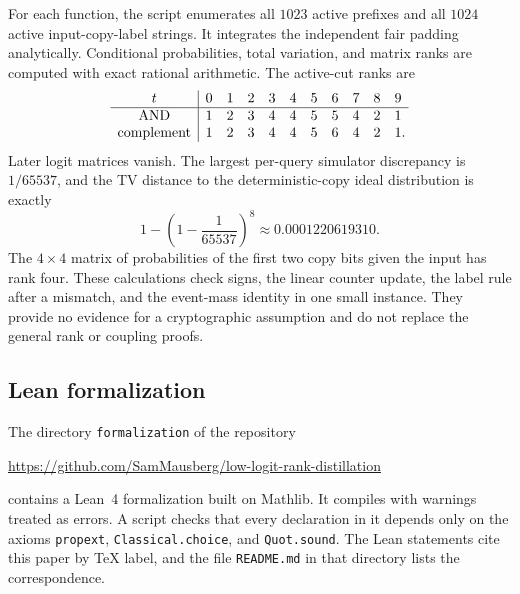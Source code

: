 \documentclass[11pt]{article}
\theoremstyle{definition}
\theoremstyle{remark}
\begin{document}
For each function, the script enumerates all $1023$ active prefixes and all $1024$ active input-copy-label strings. It integrates the independent fair padding analytically. Conditional probabilities, total variation, and matrix ranks are computed with exact rational arithmetic. The active-cut ranks are
\[
\begin{array}{c|rrrrrrrrrr}
t&0&1&2&3&4&5&6&7&8&9\\ \hline
\text{AND}&1&2&3&4&4&5&5&4&2&1\\
\text{complement}&1&2&3&4&4&5&6&4&2&1\mathrlap{.}
\end{array}
\]
Later logit matrices vanish. The largest per-query simulator discrepancy is $1/65537$, and the TV distance to the deterministic-copy ideal distribution is exactly
\[
1-\left(1-\frac1{65537}\right)^8
\approx0.0001220619310.
\]
The $4\times4$ matrix of probabilities of the first two copy bits given the input has rank four. These calculations check signs, the linear counter update, the label rule after a mismatch, and the event-mass identity in one small instance. They provide no evidence for a cryptographic assumption and do not replace the general rank or coupling proofs.

\subsection{Lean formalization}

The directory \texttt{formalization} of the repository
\begin{center}
\url{https://github.com/SamMausberg/low-logit-rank-distillation}
\end{center}
contains a Lean~4 formalization built on Mathlib. It compiles with warnings treated as errors. A script checks that every declaration in it depends only on the axioms \texttt{propext}, \texttt{Classical.choice}, and \texttt{Quot.sound}. The Lean statements cite this paper by \TeX{} label, and the file \texttt{README.md} in that directory lists the correspondence.
\end{document}
